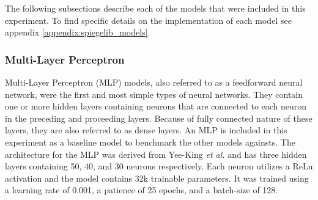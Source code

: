 The following subsections describe each of the models that were included in this experiment. To find specific details on the implementation of each model see appendix \ref{appendix:spiegelib_models}.


\subsubsection{Multi-Layer Perceptron}
Multi-Layer Perceptron (MLP) models, also referred to as a feedforward neural network, were the first and most simple types of neural networks. They contain one or more hidden layers containing neurons that are connected to each neuron in the preceding and proceeding layers. Because of fully connected nature of these layers, they are also referred to as dense layers. An MLP is included in this experiment as a baseline model to benchmark the other models againsts. The architecture for the MLP was derived from Yee-King \textit{et al.} \cite{yee2018automatic} and has three hidden layers containing 50, 40, and 30 neurons respectively. Each neuron utilizes a ReLu activation and the model contains 32k trainable parameters. It was trained using a learning rate of 0.001, a patience of 25 epochs, and a batch-size of 128.

